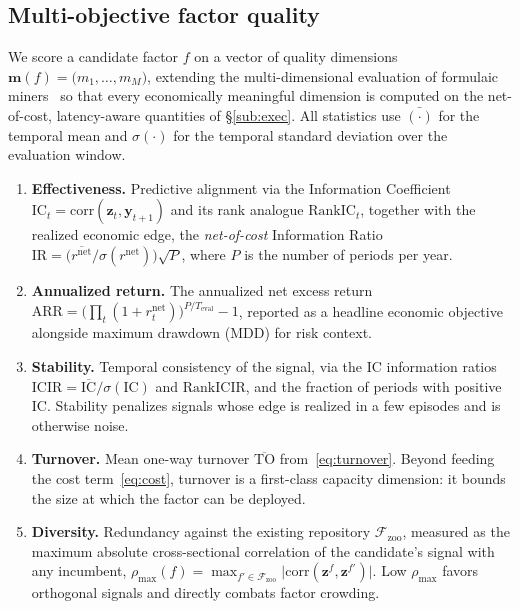 \documentclass[11pt]{article}
\newcommand{\Fspace}{\mathcal{F}}
\newcommand{\sign}{\mathbf{z}}
\newcommand{\zoo}{\Fspace_{\mathrm{zoo}}}
\begin{document}
\subsection{Multi-objective factor quality}
\label{sub:objectives}

We score a candidate factor $f$ on a vector of quality dimensions
$\bm{m}(f)=\big(m_1,\dots,m_M\big)$, extending the multi-dimensional evaluation of
formulaic miners~\cite{shi2025alphajungle} so that every economically meaningful
dimension is computed on the net-of-cost, latency-aware quantities of
\S\ref{sub:exec}. All statistics use $\bar{(\cdot)}$ for the temporal mean and
$\sigma(\cdot)$ for the temporal standard deviation over the evaluation window.

\begin{enumerate}[leftmargin=1.6em,itemsep=3pt]
\item \textbf{Effectiveness.} Predictive alignment via the Information Coefficient
      $\mathrm{IC}_t=\mathrm{corr}(\sign_t,\bm{y}_{t+1})$ and its rank analogue
      $\mathrm{RankIC}_t$, together with the realized economic edge, the
      \emph{net-of-cost} Information Ratio
      $\mathrm{IR}=\big(\overline{r^{\mathrm{net}}}/\sigma(r^{\mathrm{net}})\big)\sqrt{P}$,
      where $P$ is the number of periods per year.

\item \textbf{Annualized return.} The annualized net excess return
      $\mathrm{ARR}=\big(\prod_t (1+r^{\mathrm{net}}_t)\big)^{P/T_{\text{eval}}}-1$,
      reported as a headline economic objective alongside maximum drawdown (MDD) for
      risk context.

\item \textbf{Stability.} Temporal consistency of the signal, via the IC information
      ratios $\mathrm{ICIR}=\overline{\mathrm{IC}}/\sigma(\mathrm{IC})$ and
      $\mathrm{RankICIR}$, and the fraction of periods with positive IC. Stability
      penalizes signals whose edge is realized in a few episodes and is otherwise
      noise.

\item \textbf{Turnover.} Mean one-way turnover $\overline{\mathrm{TO}}$
      from~\eqref{eq:turnover}. Beyond feeding the cost term~\eqref{eq:cost}, turnover
      is a first-class capacity dimension: it bounds the size at which the factor can be
      deployed.

\item \textbf{Diversity.} Redundancy against the existing repository $\zoo$, measured
      as the maximum absolute cross-sectional correlation of the candidate's signal
      with any incumbent, $\rho_{\max}(f)=\max_{f'\in\zoo}\big|\mathrm{corr}(\sign^{f},\sign^{f'})\big|$.
      Low $\rho_{\max}$ favors orthogonal signals and directly combats factor crowding.


\end{enumerate}
\end{document}
